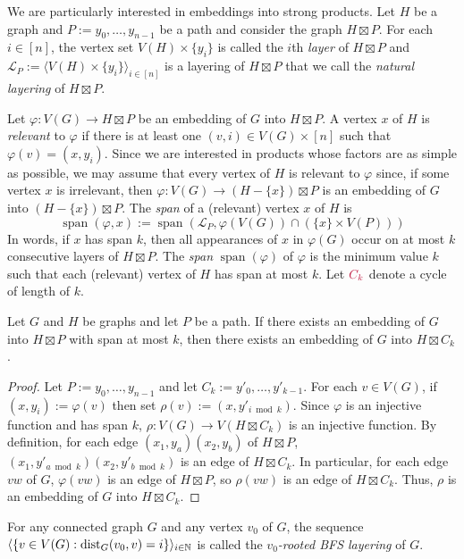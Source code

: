 \documentclass{patmorin}
\makeatletter
\newcommand{\defin}[1]{\emph{\textcolor{brightmaroon}{#1}}}
\def\mathcolor#1#{\@mathcolor{#1}}
\def\@mathcolor#1#2#3{%
  \protect\leavevmode
  \begingroup
    \color#1{#2}#3%
  \endgroup
}
\newcommand{\mathdefin}[1]{\mathcolor{brightmaroon}{#1}}
\DeclareMathOperator{\spn}{span}
\DeclareMathOperator{\dist}{dist}
\makeatother
\begin{document}
We are particularly interested in embeddings into strong products.  Let $H$ be a graph and $P:=y_0,\ldots,y_{n-1}$ be a path and consider the graph $H\boxtimes P$.  For each $i\in[n]$, the vertex set $V(H)\times\{y_i\}$ is called the $i$th \defin{layer} of $H\boxtimes P$ and $\mathcal{L}_P:=\langle V(H)\times\{y_i\} \rangle_{i\in[n]}$ is a layering of $H\boxtimes P$ that we call the \defin{natural layering} of $H\boxtimes P$.

Let $\varphi:V(G)\to H\boxtimes P$ be an embedding of $G$ into $H\boxtimes P$. A vertex $x$ of $H$ is \defin{relevant} to $\varphi$ if there is at least one $(v,i)\in V(G)\times [n]$ such that $\varphi(v)=(x,y_i)$.  Since we are interested in products whose factors are as simple as possible, we may assume that every vertex of $H$ is relevant to $\varphi$ since, if some vertex $x$ is irrelevant, then $\varphi:V(G)\to (H-\{x\})\boxtimes P$ is an embedding of $G$ into $(H-\{x\})\boxtimes P$. The \defin{span} of a (relevant) vertex $x$ of $H$ is
\[
  \spn(\varphi,x):=\spn(\mathcal{L}_P, \varphi(V(G))\cap (\{x\}\times V(P)))
\]
In words, if $x$ has span $k$, then all appearances of $x$ in $\varphi(G)$ occur on at most $k$ consecutive layers of $H\boxtimes P$.  The \defin{span} $\spn(\varphi)$ of $\varphi$ is the minimum value $k$ such that each (relevant) vertex of $H$ has span at most $k$.  Let $\mathdefin{C_k}$ denote a cycle of length of $k$.

\begin{lem}
  Let $G$ and $H$ be graphs and let $P$ be a path.  If there exists an embedding of $G$ into $H\boxtimes P$ with span at most $k$, then there exists an embedding of $G$ into $H\boxtimes C_k$.
\end{lem}

\begin{proof}
  Let $P:=y_0,\ldots,y_{n-1}$ and let $C_k:=y'_0,\ldots,y'_{k-1}$.  For each $v\in V(G)$, if $(x,y_i):=\varphi(v)$ then set $\rho(v):=(x,y'_{i\bmod k})$.  Since $\varphi$ is an injective function and has span $k$, $\rho:V(G)\to V(H\boxtimes C_k)$ is an injective function. By definition, for each edge $(x_1,y_{a})(x_2,y_b)$ of $H\boxtimes P$,  $(x_1,y'_{a\bmod k})(x_2,y'_{b\bmod k})$ is an edge of $H\boxtimes C_k$.  In particular, for each edge $vw$ of $G$, $\varphi(vw)$ is an edge of $H\boxtimes P$, so $\rho(vw)$ is an edge of $H\boxtimes C_k$.  Thus, $\rho$ is an embedding of $G$ into $H\boxtimes C_k$.
\end{proof}

For any connected graph $G$ and any vertex $v_0$ of $G$, the sequence $\langle \{v\in V(G):\dist_G(v_0,v)=i\}\rangle_{i\in\N}$ is called the \defin{$v_0$-rooted BFS layering} of $G$.
\end{document}
